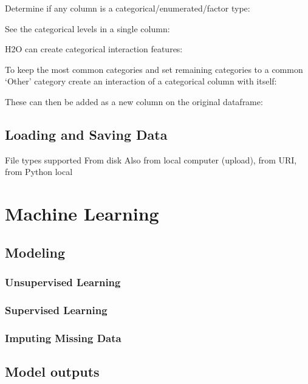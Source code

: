 Determine if any column is a categorical/enumerated/factor type:


See the categorical levels in a single column:


H2O can create categorical interaction features:


To keep the most common categories and set remaining categories to a common `Other' category
create an interaction of a categorical column with itself:


These can then be added as a new column on the original dataframe:


\subsection{Loading and Saving Data}
File types supported
From disk
Also from local computer (upload), from URI, from Python local


\section{Machine Learning}

\subsection{Modeling}
\subsubsection{Unsupervised Learning}
\subsubsection{Supervised Learning}
\subsubsection{Imputing Missing Data}

\subsection{Model outputs}
